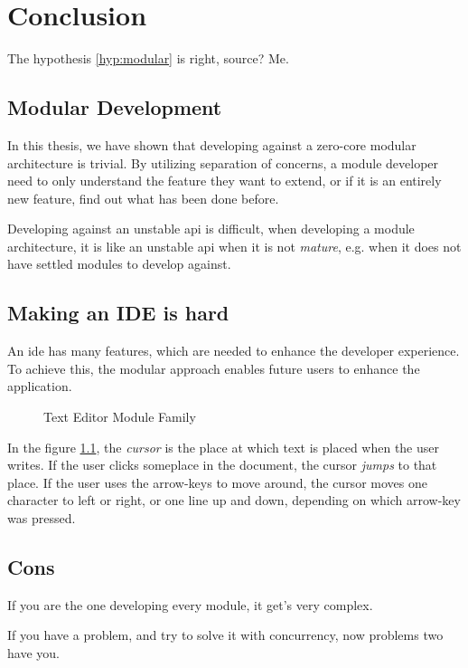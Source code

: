 \chapter{Conclusion} \label{cha:conclusion}

The hypothesis \ref{hyp:modular} is right, source? Me.

\section{Modular Development}

In this thesis, we have shown that developing against a zero-core modular
architecture is trivial. By utilizing separation of concerns, a module developer
need to only understand the feature they want to extend, or if it is an entirely
new feature, find out what has been done before.

Developing against an unstable \gls{api} is difficult, when developing a module
architecture, it is like an unstable \gls{api} when it is not \textit{mature},
e.g. when it does not have settled modules to develop against.

\section{Making an IDE is hard}

An \gls{ide} has many features, which are needed to enhance the developer
experience. To achieve this, the modular approach enables future users to
enhance the application.

\begin{figure}
  \centering
  
  \caption{Text Editor Module Family}
  \label{fig:extendedModuleFamily}
\end{figure}

In the figure \ref{fig:extendedModuleFamily}, the \textit{cursor} is the place
at which text is placed when the user writes. If the user clicks someplace in
the document, the cursor \textit{jumps} to that place. If the user uses the
arrow-keys to move around, the cursor moves one character to left or right, or
one line up and down, depending on which arrow-key was pressed.

\section{Cons}

If you are the one developing every module, it get's very complex.

If you have a problem, and try to solve it with concurrency, now problems two
have you.
